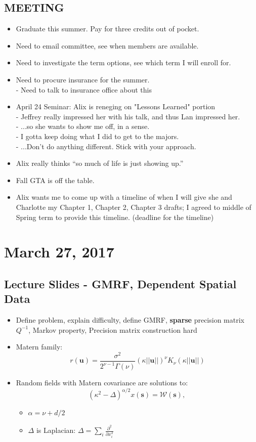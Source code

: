 \documentclass{article}
\begin{document}
\subsection*{MEETING}
\begin{itemize}
\item Graduate this summer. Pay for three credits out of pocket. 
\item Need to email committee, see when members are available. 
\item Need to investigate the term options, see which term I will enroll for. 
\item Need to procure insurance for the summer. \\
     - Need to talk to insurance office about this 
\item April 24 Seminar: Alix is reneging on "Lessons Learned" portion \\
     - Jeffrey really impressed her with his talk, and thus Lan impressed her.  \\
     - ...so she wants to show me off, in a sense. \\
     - I gotta keep doing what I did to get to the majors. \\ 
     - ...Don't do anything different. Stick with your approach. \\
\item Alix really thinks ``so much of life is just showing up.'' 
\item Fall GTA is off the table. 
\item Alix wants me to come up with a timeline of when I will give she and Charlotte my Chapter 1, Chapter 2, Chapter 3 drafts; I agreed to middle of Spring term to provide this timeline. (deadline for the timeline) 
\end{itemize}

\section*{March 27, 2017}

\subsection*{Lecture Slides - GMRF, Dependent Spatial Data}
\citep{Lindstrom2011}
\begin{itemize}
\item Define problem, explain difficulty, define GMRF, {\bf sparse} precision matrix $Q^{-1}$, Markov property, Precision matrix construction hard
\item  Matern family:
 $$r(\pmb{u}) = \frac{\sigma^{2}}{2^{\nu - 1}\Gamma(\nu)}(\kappa||\pmb{u}||)^{\nu}K_{\nu}(\kappa||\pmb{u}||)$$
\item Random fields with Matern covariance are solutions to:
$$ (\kappa^{2} - \Delta)^{\alpha/2}x(\pmb{s}) = \mathcal{W}(\pmb{s})\text{, } $$
      \begin{itemize}
      \item $\alpha = \nu + d/2$
      \item $\Delta$ is Laplacian: $ \Delta = \sum_{i} \frac{\partial^{2}}{\partial x_{i}^{2}} $
      \end{itemize}
\end{itemize}
\end{document}
